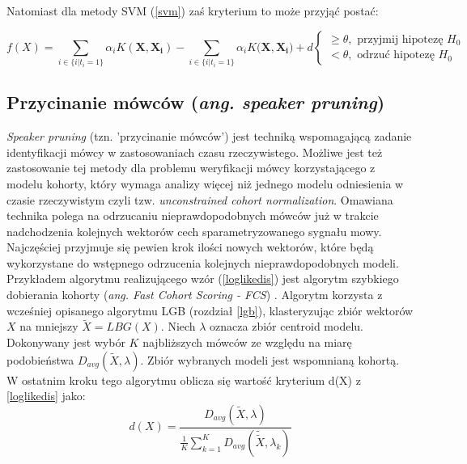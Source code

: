 Natomiast dla metody SVM (\ref{svm}) zaś kryterium to może przyjąć postać:

\begin{equation}
  \label{loglikesvm}
  f(X)= \sum_{i\in\{i|t_i = 1\}} \alpha_i K(\bm{X},\bm{X_i}) - \sum_{i\in\{i|t_i = 1\}}\alpha_i K(\bm{X},\bm{X_i)} + d
  \begin{cases}
    \ge \theta, \textrm{ przyjmij hipotezę } H_0 \\
    < \theta, \textrm{ odrzuć hipotezę } H_0
  \end{cases}
\end{equation}

\subsection{Przycinanie mówców (\textit{ang. speaker pruning}) \label{speakerprunning}}

\textit{Speaker pruning} (tzn. 'przycinanie mówców') jest techniką wspomagającą zadanie identyfikacji mówcy w zastosowaniach czasu rzeczywistego. Możliwe jest też zastosowanie tej metody dla problemu weryfikacji mówcy korzystającego z modelu kohorty, który wymaga analizy więcej niż jednego modelu odniesienia w czasie rzeczywistym czyli tzw. \textit{unconstrained cohort normalization}. Omawiana technika polega na odrzucaniu nieprawdopodobnych mówców już w trakcie nadchodzenia kolejnych wektorów
cech sparametryzowanego sygnału mowy. Najczęściej przyjmuje się pewien krok ilości nowych wektorów, które będą wykorzystane do wstępnego odrzucenia kolejnych nieprawdopodobnych modeli. Przykładem algorytmu realizującego wzór (\ref{loglikedis}) jest algorytm szybkiego dobierania kohorty (\textit{ang. Fast Cohort Scoring - FCS}) \cite{finprunning}. Algorytm korzysta z wcześniej opisanego algorytmu LGB (rozdział \ref{lgb}), klasteryzując zbiór wektorów $X$ na mniejszy $\tilde{X} = LBG(X)$. Niech $\lambda$ oznacza zbiór centroid modelu. Dokonywany jest wybór $K$ najbliższych mówców ze względu na miarę podobieństwa $D_{avg}(\tilde{X},\lambda)$. Zbiór wybranych modeli jest wspomnianą kohortą. W ostatnim kroku tego algorytmu oblicza się wartość kryterium d(X) z \ref{loglikedis} jako:
\begin{equation}
  d(X) = \frac{D_{avg}(\tilde{X},\lambda)}{\frac{1}{K}\sum_{k=1}^{K}D_{avg}(\tilde{\tilde{X}},\lambda_k)}
\end{equation}

